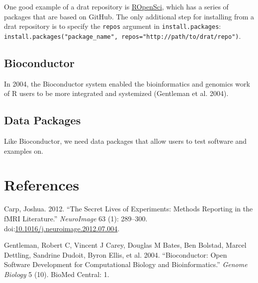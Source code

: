 \documentclass[]{elsarticle} %
\begin{document}
One good example of a drat repository is
\href{https://ropensci.org/}{ROpenSci}, which has a series of packages
that are based on GitHub. The only additional step for installing from a
drat repository is to specify the \texttt{repos} argument in
\texttt{install.packages}:
\texttt{install.packages("package\_name",\ repos="http://path/to/drat/repo")}.

\subsection{Bioconductor}

In 2004, the Bioconductor system enabled the bioinformatics and genomics
work of R users to be more integrated and systemized (Gentleman et al.
2004).

\subsection{Data Packages}\label{data-packages}

Like Bioconductor, we need data packages that allow users to test
software and examples on.

\section*{References}\label{references}

\hypertarget{refs}{}
\hypertarget{ref-carpux5fsecretux5f2012}{}
Carp, Joshua. 2012. ``The Secret Lives of Experiments: Methods Reporting
in the fMRI Literature.'' \emph{NeuroImage} 63 (1): 289--300.
doi:\href{https://doi.org/10.1016/j.neuroimage.2012.07.004}{10.1016/j.neuroimage.2012.07.004}.

\hypertarget{ref-gentleman2004bioconductor}{}
Gentleman, Robert C, Vincent J Carey, Douglas M Bates, Ben Bolstad,
Marcel Dettling, Sandrine Dudoit, Byron Ellis, et al. 2004.
``Bioconductor: Open Software Development for Computational Biology and
Bioinformatics.'' \emph{Genome Biology} 5 (10). BioMed Central: 1.
\end{document}
